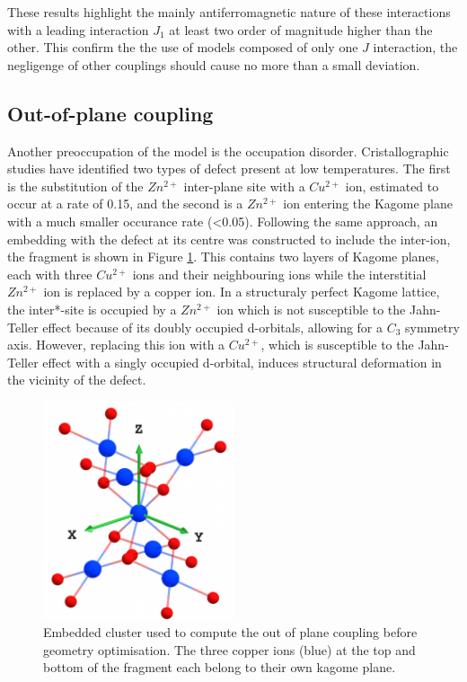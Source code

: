 \documentclass[12pt]{report}
\numberwithin{equation}{section}
\begin{document}
These results highlight the mainly antiferromagnetic nature of these interactions with a leading interaction $J_1$ at least two order of magnitude higher than the other.
This confirm the the use of models composed of only one $J$ interaction, the negligenge of other couplings should cause no more than a small deviation.

\subsection{Out-of-plane coupling}

Another preoccupation of the model is the occupation disorder. Cristallographic studies have identified two types of defect present at low temperatures. 
The first is the substitution of the $Zn^{2+}$ inter-plane site with a $Cu^{2+}$ ion, estimated to occur at a rate of 0.15, and the second is a $Zn^{2+}$ ion entering the Kagome plane with a much smaller occurance rate (<0.05).
Following the same approach, an embedding with the defect at its centre was constructed to include the inter-ion, the fragment is shown in Figure \ref{fig:FragAv}.
This contains two layers of Kagome planes, each with three $Cu^{2+}$ ions and their neighbouring ions while the interstitial $Zn^{2+}$ ion is replaced by a copper ion.
In a structuraly perfect Kagome lattice, the inter*-site is occupied by a $Zn^{2+}$ ion which is not susceptible to the Jahn-Teller effect because of its doubly occupied d-orbitals, allowing for a $C_3$ symmetry axis.
However, replacing this ion with a $Cu^{2+}$, which is susceptible to the Jahn-Teller effect with a singly occupied d-orbital, induces structural deformation in the vicinity of the defect.

\begin{figure}[!ht]
    \centering
    \includegraphics[width=0.5\textwidth]{Images/Fragment_AvOpt.png}
    \caption{Embedded cluster used to compute the out of plane coupling before geometry optimisation. The three copper ions (blue) at the top and bottom of the fragment each belong to their own kagome plane.}
    \label{fig:FragAv}
\end{figure}
\end{document}
